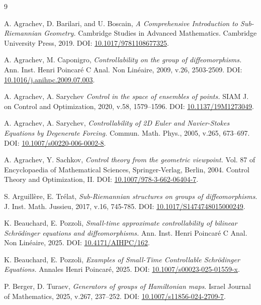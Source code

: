 \documentclass[10pt]{article}
\begin{document}
\begin{thebibliography}{9}

A. Agrachev, D. Barilari, and U. Boscain, {\it A Comprehensive Introduction to
Sub-Riemannian Geometry.} Cambridge Studies in Advanced Mathematics. Cambridge University Press, 2019. DOI: \href{https://doi.org/10.1017/9781108677325}{10.1017/9781108677325}.

 A. Agrachev, M. Caponigro, {\it Controllability on the group of diffeomorphisms.} Ann. Inst. Henri Poincaré C Anal. Non Linéaire, 2009, v.26, 2503-2509. DOI: \href{https://doi.org/10.1016/j.anihpc.2009.07.003}{10.1016/j.anihpc.2009.07.003}.

 A. Agrachev, A. Sarychev {\it Control in the space of ensembles of points.} 
SIAM J. on Control and Optimization, 2020, v.58, 1579--1596. DOI: \href{https://doi.org/10.1137/19M1273049}{10.1137/19M1273049}.

 A. Agrachev, A. Sarychev, {\it Controllability of 2D Euler and Navier-Stokes Equations
by Degenerate Forcing.} Commun. Math. Phys., 2005, v.265, 673–697. DOI: \href{https://doi.org/10.1007/s00220-006-0002-8}{10.1007/s00220-006-0002-8}.

 A. Agrachev, Y. Sachkov, {\it Control theory from the geometric viewpoint.} Vol. 87
of Encyclopaedia of Mathematical Sciences, Springer-Verlag, Berlin, 2004. Control Theory and Optimization, II. DOI: \href{https://doi.org/10.1007/978-3-662-06404-7}{10.1007/978-3-662-06404-7}.

 S. Arguillère, E. Trélat, {\it Sub-Riemannian structures on groups of diffeomorphisms}.  J. Inst. Math. Jussieu, 2017, v.16, 745-785. DOI: \href{https://doi.org/10.1017/S1474748015000249}{10.1017/S1474748015000249}.

 K. Beauchard, E. Pozzoli, {\it Small-time approximate controllability of bilinear Schrödinger equations and diffeomorphisms.} Ann. Inst. Henri Poincaré C Anal. Non Linéaire, 2025. DOI: \href{https://doi.org/10.4171/aihpc/162}{10.4171/AIHPC/162}.

 K. Beauchard, E. Pozzoli, {\it Examples of Small-Time Controllable Schrödinger Equations.} Annales Henri Poincaré, 2025. DOI: \href{https://link.springer.com/article/10.1007/s00023-025-01559-x?utm_source=rct_congratemailt&utm_medium=email&utm_campaign=nonoa_20250315&utm_content=10.1007/s00023-025-01559-x}{10.1007/s00023-025-01559-x}.

 P. Berger, D. Turaev, {\it Generators of groups of Hamiltonian maps}.  Israel Journal of Mathematics, 2025, v.267, 237–252. DOI: \href{https://doi.org/10.1007/s11856-024-2709-7}{10.1007/s11856-024-2709-7}.


\end{thebibliography}
\end{document}
